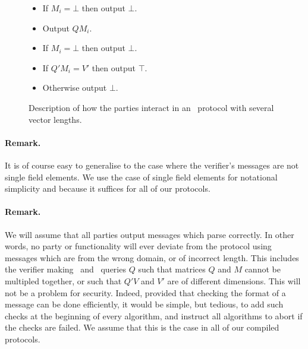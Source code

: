 \begin{figure}[!h]
{\begin{minipage}[t]{6.5cm}
\begin{algorithm}[H]
\begin{itemize}
\end{itemize}
\end{algorithm}
\begin{algorithm}[H]
\caption*{\ILCopen($\sizevect_i,Q$)}
\begin{itemize}
\item If $M_i = \bot$ then output $\bot$.
\item Output $QM_i$.
\end{itemize}
\end{algorithm}
\begin{algorithm}[H]
\caption*{\ILCcheck($\sizevect_i,Q', V'$)}
\begin{itemize}
\item If $M_i = \bot$ then output $\bot$.
\item If $Q'M_i = V'$ then output $\top$.
\item Otherwise output $\bot$.
\end{itemize}
\end{algorithm}
\end{minipage}
}
\caption{Description of how the parties interact in an \ILC\ protocol with several vector lengths.}
\label{fig:ILCpseudocodemixlen}
\end{figure}

\paragraph{Remark.} It is of course easy to generalise to the case where the verifier's messages are not single field elements. We use the case of single field elements for notational simplicity and because it suffices for all of our protocols.

\paragraph{Remark.} We will assume that all parties output messages which parse correctly. In other words, no party or functionality will ever deviate from the protocol using messages which are from the wrong domain, or of incorrect length. This includes the verifier making \ILCopen\ and \ILCcheck\ queries $Q$ such that matrices $Q$ and $M$ cannot be multipled together, or such that $Q'V$ and $V'$ are of different dimensions. This will not be a problem for security. Indeed, provided that checking the format of a message can be done efficiently, it would be simple, but tedious, to add such checks at the beginning of every algorithm, and instruct all algorithms to abort if the checks are failed. We assume that this is the case in all of our compiled protocols.

